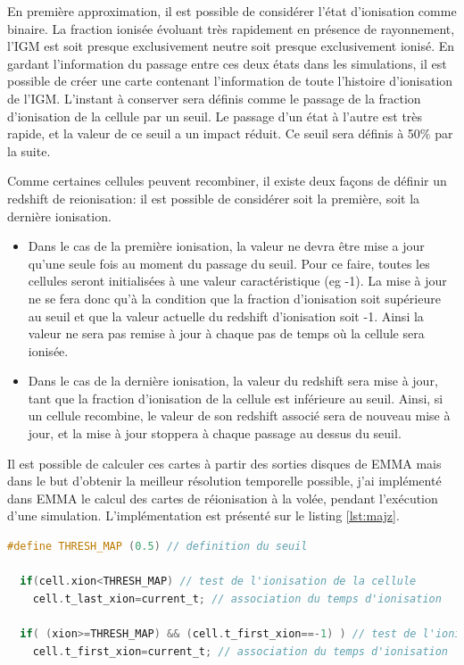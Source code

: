 En première approximation, il est possible de considérer l'état d'ionisation comme binaire.
La fraction ionisée évoluant très rapidement en présence de rayonnement, l'\ac{IGM} est soit presque exclusivement neutre soit presque exclusivement ionisé.
En gardant l'information du passage entre ces deux états dans les simulations, il est possible de créer une carte contenant l’information de toute l'histoire d'ionisation de l'\ac{IGM}.
L'instant à conserver sera définis comme le passage de la fraction d'ionisation de la cellule par un seuil.
Le passage d'un état à l'autre est très rapide, et la valeur de ce seuil a un impact réduit.
Ce seuil sera définis à 50\% par la suite.

Comme certaines cellules peuvent recombiner, il existe deux façons de définir un redshift de reionisation: il est possible de considérer soit la première, soit la dernière ionisation.


\begin{itemize}
\item Dans le cas de la première ionisation, la valeur ne devra être mise a jour qu'une seule fois au moment du passage du seuil.
Pour ce faire, toutes les cellules seront initialisées à une valeur caractéristique (eg -1).
La mise à jour ne se fera donc qu'à la condition que la fraction d'ionisation soit supérieure au seuil et que la valeur actuelle du redshift d'ionisation soit -1.
Ainsi la valeur ne sera pas remise à jour à chaque pas de temps où la cellule sera ionisée. 

\item Dans le cas de la dernière ionisation, la valeur du redshift sera mise à jour, tant que la fraction d'ionisation de la cellule est inférieure au seuil.
Ainsi, si un cellule recombine, le valeur de son redshift associé sera de nouveau mise à jour, et la mise à jour stoppera à chaque passage au dessus du seuil.
\end{itemize}

Il est possible de calculer ces cartes à partir des sorties disques de EMMA mais dans le but d'obtenir la meilleur résolution temporelle possible, j'ai implémenté dans EMMA le calcul des cartes de réionisation à la volée, pendant l'exécution d'une simulation.
L'implémentation est présenté sur le listing \ref{lst:majz}.

\begin{lstlisting}[float=bth,language=c,frame=tb,caption={Mise a jour du redshift de reionisation},label=lst:majz]
  #define THRESH_MAP (0.5) // definition du seuil

  if(cell.xion<THRESH_MAP) // test de l'ionisation de la cellule
    cell.t_last_xion=current_t; // association du temps d'ionisation 

  if( (xion>=THRESH_MAP) && (cell.t_first_xion==-1) ) // test de l'ionisation de la cellule et de premiere ionisation
    cell.t_first_xion=current_t; // association du temps d'ionisation 
    
\end{lstlisting}

